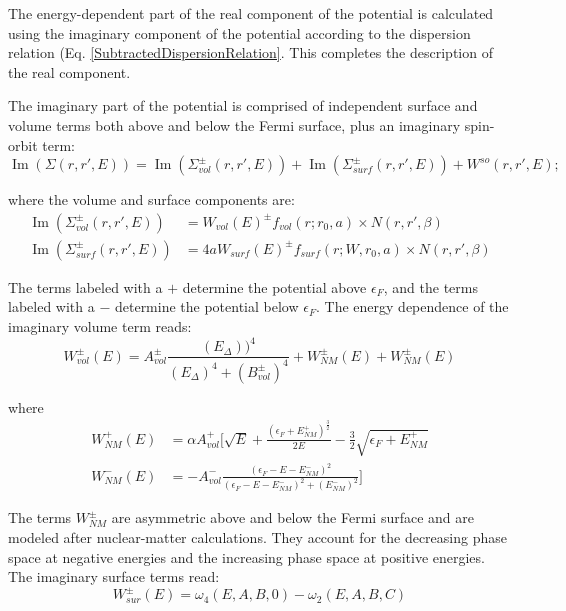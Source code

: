 \noindent
The energy-dependent part of the real component of the potential is calculated using the imaginary
component of the potential according to the dispersion relation (Eq.
\ref{SubtractedDispersionRelation}. This completes the description of the real component.

The imaginary part of the potential is comprised of independent surface and volume terms
both above and below the Fermi surface, plus an imaginary spin-orbit term:
\begin{equation}
    \operatorname{Im}({\Sigma(r,r',E)}) =
    \operatorname{Im}({\Sigma_{vol}^{\pm}(r,r',E)})
    + \operatorname{Im}({\Sigma_{surf}^{\pm}(r,r',E)})
    + W^{so}(r,r',E);
\end{equation}

\noindent
where the volume and surface components are:
\begin{equation}
    \begin{split}
    \operatorname{Im}({\Sigma_{vol}^{\pm}(r,r',E)})
    & = W_{vol}(E)^{\pm}f_{vol}(r; r_{0}, a){\times}N(r,r',\beta)\\
    \operatorname{Im}({\Sigma_{surf}^{\pm}(r,r',E)})
    & = 4aW_{surf}(E)^{\pm}f_{surf}(r; W, r_{0}, a){\times}N(r,r',\beta)
\end{split}
\end{equation}

\noindent
The terms labeled with a $+$ determine the potential above $\epsilon_{F}$, and the terms labeled
with a $-$ determine the potential below $\epsilon_{F}$. The energy dependence of the imaginary
volume term reads:
\begin{equation}
    W_{vol}^{\pm}(E) = A_{vol}^{\pm}\frac{(E_{\Delta}))^{4}}
    {(E_{\Delta})^{4}+(B_{vol}^{\pm})^{4}} + W_{NM}^{\pm}(E)
    + W_{NM}^{\pm}(E)
\end{equation}

\noindent
where
\begin{equation}
    \begin{split}
        W_{NM}^{+}(E) & = {\alpha}A_{vol}^{+}[\sqrt{E} +
            \frac{(\epsilon_{F}+E^{+}_{NM})^{\frac{3}{2}}}{2E}
            -\frac{3}{2}\sqrt{\epsilon_{F}+E^{+}_{NM}}\\
            W_{NM}^{-}(E) & = -A_{vol}^{-}\frac{(\epsilon_{F}-E-E_{NM}^{-})^{2}}
        {(\epsilon_{F}-E-E_{NM}^{-})^{2}+(E_{NM}^{-})^{2}}]
        \end{split}
    \end{equation}

\noindent
The terms $W_{NM}^{\pm}$ are asymmetric above and below the Fermi surface and are modeled after
nuclear-matter calculations. They account for the decreasing phase space at negative energies
and the increasing phase space at positive energies. The imaginary surface terms read:
\begin{equation}
    W_{sur}^{\pm}(E) = \omega_{4}(E, A, B, 0) - \omega_{2}(E, A, B, C)
\end{equation}

